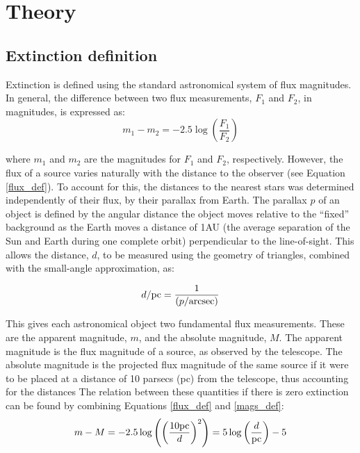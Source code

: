 \documentclass[12pt, a4paper]{report}
\begin{document}
\chapter{Theory}
\section{Extinction definition} \label{extinc_desc}
Extinction is defined using the standard astronomical system of flux magnitudes. In general, the difference between two flux measurements, $F_{1}$ and $F_{2}$, in magnitudes, is expressed as:
\begin{equation}
\label{mags_def}
m_{1} - m_{2} = -2.5\log \left( \frac{F_{1}}{F_{2}} \right)
\end{equation}

where $m_{1}$ and $m_{2}$ are the magnitudes for $F_{1}$ and $F_{2}$, respectively. However, the flux of a source varies naturally with the distance to the observer (see Equation \ref{flux_def}). To account for this, the distances to the nearest stars was determined independently of their flux, by their parallax from Earth. The parallax $p$ of an object is defined by the angular distance the object moves relative to the ``fixed'' background as the Earth moves a distance of 1AU (the average separation of the Sun and Earth during one complete orbit) perpendicular to the line-of-sight. This allows the distance, $d$, to be measured using the geometry of triangles, combined with the small-angle approximation, as:

\begin{equation}
d/\textnormal{pc} = \frac{1}{(p/\textnormal{arcsec})}
\end{equation}

This gives each astronomical object two fundamental flux measurements. These are the apparent magnitude, $m$, and the absolute magnitude, $M$. The apparent magnitude is the flux magnitude of a source, as observed by the telescope. The absolute magnitude is the projected flux magnitude of the same source if it were to be placed at a distance of 10 parsecs (pc) from the telescope, thus accounting for the distances The relation between these quantities if there is zero extinction can be found by combining Equations \ref{flux_def} and \ref{mags_def}:
\begin{equation}
\label{distance_modulus}
m - M = -2.5\log \left( \left(\frac{10\textnormal{pc}}{d}\right)^{2} \right) = 5\log\left(\frac{d}{\textnormal{pc}}\right) - 5
\end{equation}
\end{document}

